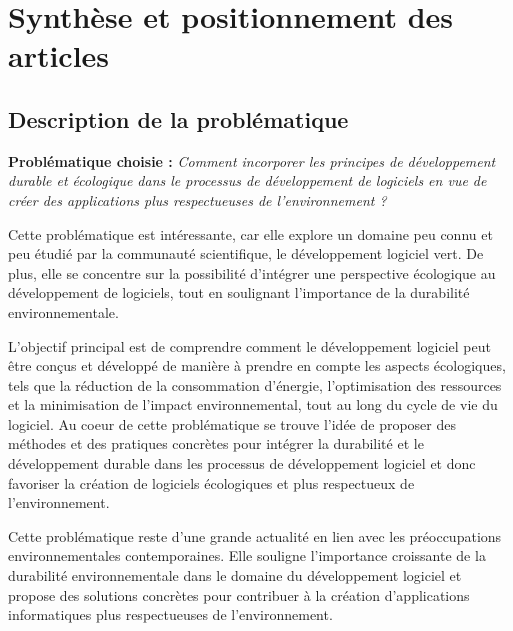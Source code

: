 
\chapter{Synthèse et positionnement des articles} %
\label{app:Fiche0} %

\section{Description de la problématique}

\textbf{Problématique choisie :} \emph{Comment incorporer les principes de développement durable et écologique dans le processus de développement de logiciels en vue de créer des applications plus respectueuses de l'environnement ?}

\vspace{0.5cm}

Cette problématique est intéressante, car elle explore un domaine peu connu et peu étudié par la communauté scientifique, le développement logiciel vert. De plus, elle se concentre sur la possibilité d'intégrer une perspective écologique au développement de logiciels, tout en soulignant l'importance de la durabilité environnementale.

\singlespacing
\noindent L'objectif principal est de comprendre comment le développement logiciel peut être conçus et développé de manière à prendre en compte les aspects écologiques, tels que la réduction de la consommation d'énergie, l'optimisation des ressources et la minimisation de l'impact environnemental, tout au long du cycle de vie du logiciel.
Au coeur de cette problématique se trouve l'idée de proposer des méthodes et des pratiques concrètes pour intégrer la durabilité et le développement durable dans les processus de développement logiciel et donc favoriser la création de logiciels écologiques et plus respectueux de l'environnement.

\singlespacing
\noindent Cette problématique reste d'une grande actualité en lien avec les préoccupations environnementales contemporaines. Elle souligne l'importance croissante de la durabilité environnementale dans le domaine du développement logiciel et propose des solutions concrètes pour contribuer à la création d'applications informatiques plus respectueuses de l'environnement.

